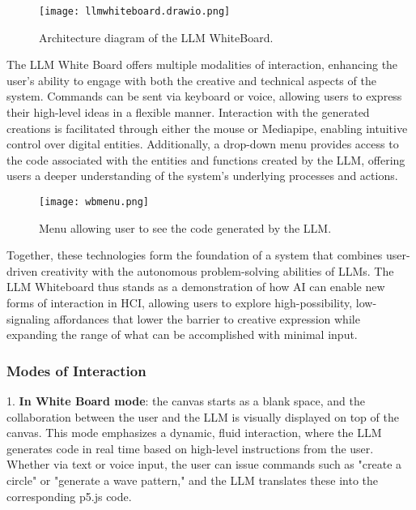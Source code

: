 \begin{figure}[h!]
    \centering
    \texttt{[image: llmwhiteboard.drawio.png]}
    \caption{Architecture diagram of the LLM WhiteBoard.}
    \vspace{0.1cm}
    \label{fig:wbarchietcure}
\end{figure}

The LLM White Board offers multiple modalities of interaction, enhancing the user’s ability to engage with both the creative and technical aspects of the system.
Commands can be sent via keyboard or voice, allowing users to express their high-level ideas in a flexible manner.
Interaction with the generated creations is facilitated through either the mouse or Mediapipe, enabling intuitive control over digital entities.
Additionally, a drop-down menu provides access to the code associated with the entities and functions created by the LLM, offering users a deeper understanding of the system’s underlying processes and actions.

\begin{figure}[h!]
    \centering
    \texttt{[image: wbmenu.png]}
    \caption{Menu allowing user to see the code generated by the LLM.}
    \vspace{0.1cm}
    \label{fig:wbmenu}
\end{figure}

Together, these technologies form the foundation of a system that combines user-driven creativity with the autonomous problem-solving abilities of LLMs.
The LLM Whiteboard thus stands as a demonstration of how AI can enable new forms of interaction in HCI, allowing users to explore high-possibility, low-signaling affordances that lower the barrier to creative expression while expanding the range of what can be accomplished with minimal input.

\subsubsection{Modes of Interaction}

1. \textbf{In White Board mode}: the canvas starts as a blank space, and the collaboration between the user and the LLM is visually displayed on top of the canvas.
This mode emphasizes a dynamic, fluid interaction, where the LLM generates code in real time based on high-level instructions from the user.
Whether via text or voice input, the user can issue commands such as "create a circle" or "generate a wave pattern," and the LLM translates these into the corresponding p5.js code.

